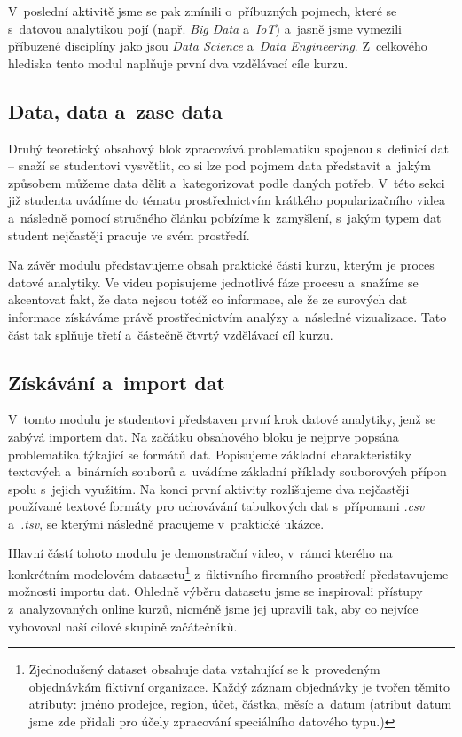 V~poslední aktivitě jsme se pak zmínili o~příbuzných pojmech, které se s~datovou analytikou pojí (např. \emph{Big Data} a~\emph{IoT}) a~jasně jsme vymezili příbuzené disciplíny jako jsou \emph{Data Science} a~\emph{Data Engineering}. Z~celkového hlediska tento modul naplňuje první dva vzdělávací cíle kurzu.

\hypertarget{data-data-a-zase-data}{%
\subsection{Data, data a~zase data}\label{data-data-a-zase-data}}

Druhý teoretický obsahový blok zpracovává problematiku spojenou s~definicí dat -- snaží se studentovi vysvětlit, co si lze pod pojmem data představit a~jakým způsobem můžeme data dělit a~kategorizovat podle daných potřeb. V~této sekci již studenta uvádíme do tématu prostřednictvím krátkého popularizačního videa a~následně pomocí stručného článku pobízíme k~zamyšlení, s~jakým typem dat student nejčastěji pracuje ve svém prostředí.

Na závěr modulu představujeme obsah praktické části kurzu, kterým je proces datové analytiky. Ve videu popisujeme jednotlivé fáze procesu a~snažíme se akcentovat fakt, že data nejsou totéž co informace, ale že ze surových dat informace získáváme právě prostřednictvím analýzy a~následné vizualizace. Tato část tak splňuje třetí a~částečně čtvrtý vzdělávací cíl kurzu.

\hypertarget{zuxedskuxe1vuxe1nuxed-a-import-dat}{%
\subsection{Získávání a~import dat}\label{zuxedskuxe1vuxe1nuxed-a-import-dat}}

V~tomto modulu je studentovi představen první krok datové analytiky, jenž se zabývá importem dat. Na začátku obsahového bloku je nejprve popsána problematika týkající se formátů dat. Popisujeme základní charakteristiky textových a~binárních souborů a~uvádíme základní příklady souborových přípon spolu s~jejich využitím. Na konci první aktivity rozlišujeme dva nejčastěji používané textové formáty pro uchovávání tabulkových dat s~příponami \emph{.csv} a~\emph{.tsv}, se kterými následně pracujeme v~praktické ukázce.

Hlavní částí tohoto modulu je demonstrační video, v~rámci kterého na konkrétním modelovém datasetu\footnote{Zjednodušený dataset obsahuje data vztahující se k~provedeným objednávkám fiktivní organizace. Každý záznam objednávky je tvořen těmito atributy: jméno prodejce, region, účet, částka, měsíc a~datum (atribut datum jsme zde přidali pro účely zpracování speciálního datového typu.)} z~fiktivního firemního prostředí představujeme možnosti importu dat. Ohledně výběru datasetu jsme se inspirovali přístupy z~analyzovaných online kurzů, nicméně jsme jej upravili tak, aby co nejvíce vyhovoval naší cílové skupině začátečníků.

